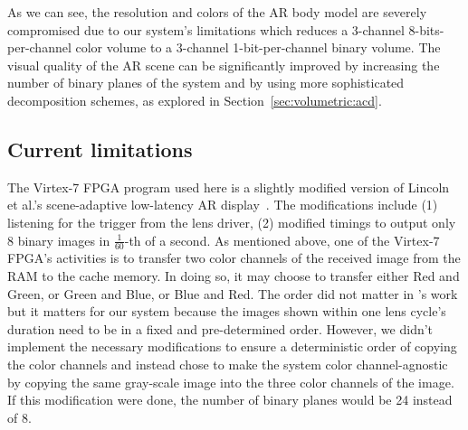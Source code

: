 As we can see, the resolution and colors of the AR body model are severely compromised due to our system's limitations which reduces a 3-channel 8-bits-per-channel color volume to a 3-channel 1-bit-per-channel binary volume.
The visual quality of the AR scene can be significantly improved by increasing the number of binary planes of the system and by using more sophisticated decomposition schemes, as explored in Section~\ref{sec:volumetric:acd}.

\subsection{Current limitations}
\label{sec:volumetric:rts:limitations}
The Virtex-7 FPGA program used here is a slightly modified version of Lincoln et al.'s scene-adaptive low-latency AR display~\cite{Lincoln2017scene}.
The modifications include (1) listening for the trigger from the lens driver, (2) modified timings to output only 8 binary images in $\frac{1}{60}$-th of a second.
As mentioned above, one of the Virtex-7 FPGA's activities is to transfer two color channels of the received image from the RAM to the cache memory.
In doing so, it may choose to transfer either Red and Green, or Green and Blue, or Blue and Red.
The order did not matter in \cite{Lincoln2017scene}'s work but it matters for our system because the images shown within one lens cycle's duration need to be in a fixed and pre-determined order. 
However, we didn't implement the necessary modifications to ensure a deterministic order of copying the color channels and instead chose to make the system color channel-agnostic by copying the same gray-scale image into the three color channels of the image. 
If this modification were done, the number of binary planes would be 24 instead of 8.



